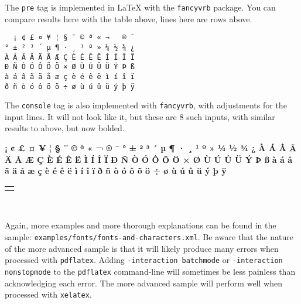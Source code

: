 \documentclass[10pt,]{article}
\theoremstyle{plain}
\theoremstyle{definition}
\theoremstyle{definition}
\theoremstyle{definition}
\theoremstyle{definition}
\theoremstyle{definition}
\theoremstyle{definition}
\numberwithin{equation}{section}
\newcommand{\consoleinput}[1]{\textbf{#1}}
\newlength{\panelmax}
\begin{document}
\hypertarget{p-607}{}%
The \lstinline?pre? tag is implemented in \LaTeX{} with the \lstinline?fancyvrb? package.  You can compare results here with the table above, lines here are rows above.%
\begin{verbatim}
  ¡ ¢ £ ¤ ¥ ¦ § ¨ © ª « ¬   ® ¯
° ± ² ³ ´ µ ¶ · ¸ ¹ º » ¼ ½ ¾ ¿
À Á Â Ã Ä Å Æ Ç È É Ê Ë Ì Í Î Ï
Ð Ñ Ò Ó Ô Õ Ö × Ø Ù Ú Û Ü Ý Þ ß
à á â ã ä å æ ç è é ê ë ì í î ï
ð ñ ò ó ô õ ö ÷ ø ù ú û ü ý þ ÿ
\end{verbatim}
\hypertarget{p-608}{}%
The \lstinline?console? tag is also implemented with \lstinline?fancyvrb?, with adjustments for the input lines.  It will not look like it, but these are 8 such inputs, with similar results to above, but now bolded.%
{%
\setlength{\panelmax}{0pt}
\ifdefined\panelboxAconsole\else\newsavebox{\panelboxAconsole}\fi%
\begin{lrbox}{\panelboxAconsole}
\begin{console}[boxwidth=1\linewidth]
\consoleinput{¡ ¢ £ ¤ ¥ ¦ § ¨ © ª « ¬   ® ¯}
\consoleinput{° ± ² ³ ´ µ ¶ · ¸ ¹ º » ¼ ½ ¾ ¿}
\consoleinput{À Á Â Ã Ä Å Æ Ç È É Ê Ë Ì Í Î Ï}
\consoleinput{Ð Ñ Ò Ó Ô Õ Ö × Ø Ù Ú Û Ü Ý Þ ß}
\consoleinput{à á â ã ä å æ ç è é ê ë ì í î ï}
\consoleinput{ð ñ ò ó ô õ ö ÷ ø ù ú û ü ý þ ÿ}
\end{console}
\end{lrbox}
\ifdefined\phAconsole\else\newlength{\phAconsole}\fi%
\setlength{\phAconsole}{\ht\panelboxAconsole+\dp\panelboxAconsole}
\settototalheight{\phAconsole}{\usebox{\panelboxAconsole}}
\setlength{\panelmax}{\maxof{\panelmax}{\phAconsole}}
\leavevmode%
\setlength{\tabcolsep}{0\linewidth}
\par\medskip\noindent
\begin{tabular}{@{}*{1}{c}@{}}
\begin{minipage}[c][\panelmax][t]{1\linewidth}\usebox{\panelboxAconsole}\end{minipage}\end{tabular}\\
}%
\par
\hypertarget{p-609}{}%
Again, more examples and more thorough explanations can be found in the sample: \lstinline?examples/fonts/fonts-and-characters.xml?.  Be aware that the nature of the more advanced sample is that it will likely produce many errors when processed with \lstinline?pdflatex?.  Adding \lstinline?-interaction batchmode? or \lstinline?-interaction nonstopmode? to the \lstinline?pdflatex? command-line will sometimes be less painless than acknowledging each error.  The more advanced sample will perform well when processed with \lstinline?xelatex?.%
\typeout{************************************************}
\typeout{************************************************}
\end{document}
